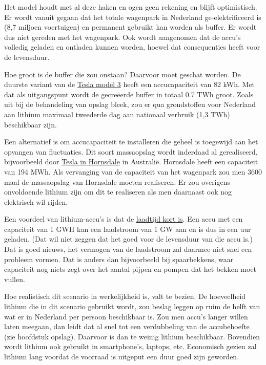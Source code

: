\documentclass[
  11pt,
  a4paper,
]{book}
\begin{document}
Het model houdt met al deze haken en ogen geen rekening en blijft optimistisch. Er wordt vanuit gegaan dat het totale wagenpark in Nederland ge-elektrificeerd is (8,7 miljoen voertuigen) en permanent gebruikt kan worden als buffer. Er wordt dus niet gereden met het wagenpark. Ook wordt aangenomen dat de accu's volledig geladen en ontladen kunnen worden, hoewel dat consequenties heeft voor de levensduur.

Hoe groot is de buffer die zou onstaan? Daarvoor moet geschat worden. De duurste variant van de \href{https://en.wikipedia.org/wiki/Tesla_Model_3}{Tesla model 3} heeft een accucapaciteit van 82 kWh. Met dat als uitgangspunt wordt de gecreëerde buffer in totaal 0.7 TWh groot. Zoals uit bij de behandeling van opslag bleek, zou er qua grondstoffen voor Nederland aan lithium maximaal tweederde dag aan nationaal verbruik (1,3 TWh) beschikbaar zijn.

Een alternatief is om accucapaciteit te installeren die geheel is toegewijd aan het opvangen van fluctuaties. Dit soort massaopslag wordt inderdaad al gerealiseerd, bijvoorbeeld door \href{https://en.wikipedia.org/wiki/Hornsdale_Power_Reserve}{Tesla in Hornsdale} in Australië. Hornsdale heeft een capaciteit van 194 MWh. Als vervanging van de capaciteit van het wagenpark zou men 3600 maal de massaopslag van Hornsdale moeten realiseren. Er zou overigens onvoldoende lithium zijn om dit te realiseren als men daarnaast ook nog elektrisch wil rijden.

Een voordeel van lithium-accu's is dat de \href{https://en.wikipedia.org/wiki/Lithium-ion_battery\#Charge_and_discharge}{laadtijd kort is}. Een accu met een capaciteit van 1 GWH kan een laadstroom van 1 GW aan en is dus in een uur geladen. (Dat wil niet zeggen dat het goed voor de levensduur van die accu is.) Dat is goed nieuws, het vermogen van de laadstroom zal daarmee niet snel een probleem vormen. Dat is anders dan bijvoorbeeld bij spaarbekkens, waar capaciteit nog niets zegt over het aantal pijpen en pompen dat het bekken moet vullen.

Hoe realistisch dit scenario in werkelijkheid is, valt te bezien. De hoeveelheid lithium die in dit scenario gebruikt wordt, zou beslag leggen op ruim de helft van wat er in Nederland per persoon beschikbaar is. Zou men accu's langer willen laten meegaan, dan leidt dat al snel tot een verdubbeling van de accubehoefte (zie hoofdstuk opslag). Daarvoor is dan te weinig lithium beschikbaar. Bovendien wordt lithium ook gebruikt in smartphone's, laptops, etc. Economisch gezien zal lithium lang voordat de voorraad is uitgeput een duur goed zijn geworden.
\end{document}

